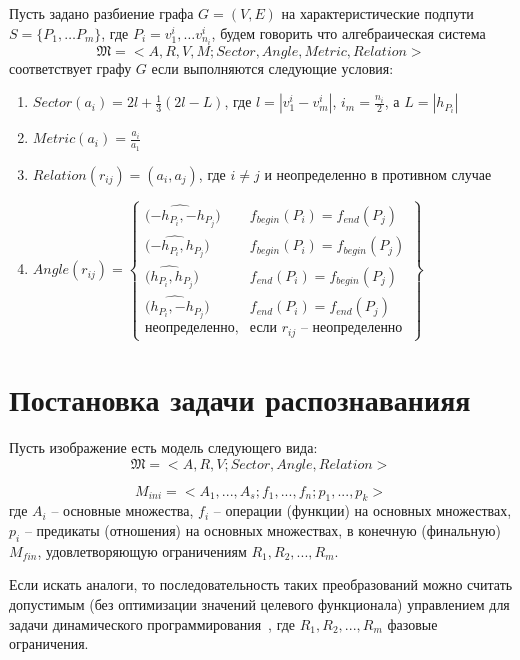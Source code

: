 \begin{definition}
Пусть задано разбиение графа $G=(V,E)$ на характеристические подпути $S=\{P_1, \dots P_m\}$, где $P_i=v^i_1, \dots v^i_{n_i}$, будем говорить что алгебраическая система
$$\mathfrak{M} = < A, R, V, M; Sector, Angle, Metric, Relation >$$
соответствует графу $G$ если выполняются следующие условия:
\begin{enumerate}
\item $Sector(a_i) = 2l + \frac{1}{3}(2l - L)$, где $l=|v^i_1-v^i_m|$, $i_m = \frac{n_i}{2}$,  а $L=|h_{P_i}|$
\item $Metric(a_i) = \frac{a_i}{a_1}$
\item $Relation(r_{ij}) = (a_i, a_j)$, где $i\neq j$ и неопределенно в противном случае
\item $Angle(r_{ij})=
	\left\{		
	\begin{array}{ll}
	\hat{(-h_{P_i}, -h_{P_j}}) & f_{begin}(P_i) = f_{end}(P_j) \\
	\hat{(-h_{P_i}, h_{P_j}}) & f_{begin}(P_i) = f_{begin}(P_j) \\
	\hat{(h_{P_i}, h_{P_j}}) & f_{end}(P_i) = f_{begin}(P_j) \\
	\hat{(h_{P_i}, -h_{P_j}}) & f_{end}(P_i) = f_{end}(P_j) \\	
	\text{неопределенно}, & \text{если } r_{ij} \text{ -- неопределенно}
	\end{array}
	\right\}	$	
\end{enumerate}
\end{definition}

\section{Постановка задачи распознаванияя }
Пусть изображение есть модель следующего вида:
\begin{equation}
\mathfrak{M} = < A, R, V; Sector, Angle, Relation >
\label{vipeq1}
\end{equation}

\begin{equation}
M_{ini} = <A_1,...,A_s;f_1,...,f_n;p_1,...,p_k>
\label{vipeq2}
\end{equation}
где $A_i$ -- основные множества, $f_i$ -- операции (функции) на основных множествах, $p_i$ -- предикаты (отношения) на основных множествах, в конечную (финальную) $M_{fin}$, удовлетворяющую ограничениям $R_1,R_2,...,R_m$.

Если искать аналоги, то последовательность таких преобразований можно считать допустимым (без оптимизации значений целевого функционала) управлением для задачи динамического программирования~\cite{9}, где $R_1,R_2,...,R_m$ фазовые ограничения.

